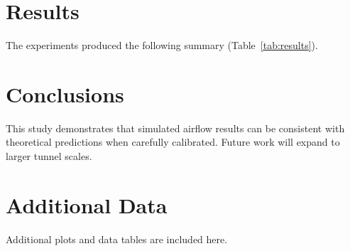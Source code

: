 \documentclass[12pt,oneside]{report}
\begin{document}
\chapter{Results}
The experiments produced the following summary (Table~\ref{tab:results}).


\chapter{Conclusions}
This study demonstrates that simulated airflow results can be consistent with theoretical predictions when carefully calibrated. Future work will expand to larger tunnel scales.

\printbibliography[title={LITERATURE CITED}]
\blankpage

\appendix
\chapter{Additional Data}
Additional plots and data tables are included here.
\end{document}
